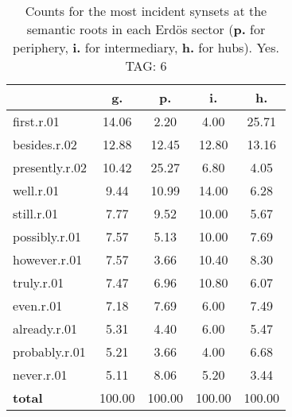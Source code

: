 \begin{table}[h!]
\begin{center}
\begin{tabular}{| l || c | c | c | c |}\hline
 & {\bf g.} & {\bf p.} & {\bf i.} & {\bf h.} \\\hline\hline
first.r.01 & 14.06  & 2.20  & 4.00  & 25.71 \\\hline
besides.r.02 & 12.88  & 12.45  & 12.80  & 13.16 \\\hline
presently.r.02 & 10.42  & 25.27  & 6.80  & 4.05 \\\hline
well.r.01 & 9.44  & 10.99  & 14.00  & 6.28 \\\hline
still.r.01 & 7.77  & 9.52  & 10.00  & 5.67 \\\hline
possibly.r.01 & 7.57  & 5.13  & 10.00  & 7.69 \\\hline
however.r.01 & 7.57  & 3.66  & 10.40  & 8.30 \\\hline
truly.r.01 & 7.47  & 6.96  & 10.80  & 6.07 \\\hline
even.r.01 & 7.18  & 7.69  & 6.00  & 7.49 \\\hline
already.r.01 & 5.31  & 4.40  & 6.00  & 5.47 \\\hline
probably.r.01 & 5.21  & 3.66  & 4.00  & 6.68 \\\hline
never.r.01 & 5.11  & 8.06  & 5.20  & 3.44 \\\hline\hline
{{\bf total}} & 100.00  & 100.00  & 100.00  & 100.00 \\\hline
\end{tabular}
\caption{Counts for the most incident synsets at the semantic roots in each Erd\"os sector ({\bf p.} for periphery, {\bf i.} for intermediary, {\bf h.} for hubs). Yes. TAG: 6}
\end{center}
\end{table}